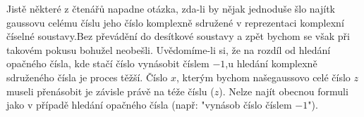 \documentclass[czech,bachelor,dept470,male]{diploma}
\begin{document}
\begin{remark}
	Jistě některé z čtenářů napadne otázka, zda-li by nějak jednoduše šlo najít\newline k gaussovu celému číslu jeho číslo komplexně sdružené v reprezentaci komplexní číselné soustavy.\newline Bez převádění do desítkové soustavy a zpět bychom se však při takovém pokusu bohužel neobešli. Uvědomíme-li si, že na rozdíl od hledání opačného čísla, kde stačí číslo vynásobit číslem $-1$,\newline u hledání komplexně sdruženého čísla je proces těžší. Číslo $x$, kterým bychom naše\newline gaussovo celé číslo $z$ museli přenásobit je závisle právě na téže číslu ($z$). Nelze najít obecnou formuli jako v případě hledání opačného čísla (např: "vynásob číslo číslem $-1$").
\end{remark}\newpage
\end{document}

